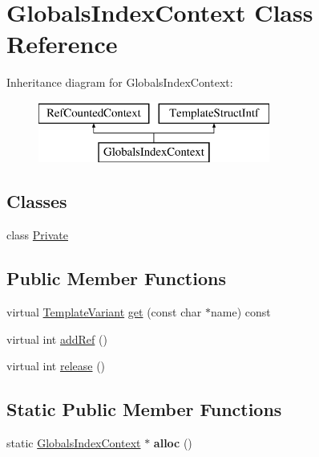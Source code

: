 \hypertarget{class_globals_index_context}{}\section{Globals\+Index\+Context Class Reference}
\label{class_globals_index_context}
Inheritance diagram for Globals\+Index\+Context\+:\begin{figure}[H]
\begin{center}
\leavevmode
\includegraphics[height=2.000000cm]{class_globals_index_context}
\end{center}
\end{figure}
\subsection*{Classes}
\begin{DoxyCompactItemize}
\item 
class \mbox{\hyperlink{class_globals_index_context_1_1_private}{Private}}
\end{DoxyCompactItemize}
\subsection*{Public Member Functions}
\begin{DoxyCompactItemize}
\item 
virtual \mbox{\hyperlink{class_template_variant}{Template\+Variant}} \mbox{\hyperlink{class_globals_index_context_a9838a4354e5e962d8ec3976dbbc7ba8d}{get}} (const char $\ast$name) const
\item 
virtual int \mbox{\hyperlink{class_globals_index_context_a90f2b7d7fd5fab2f29660ebcc1f99db4}{add\+Ref}} ()
\item 
virtual int \mbox{\hyperlink{class_globals_index_context_a65ba296c4327f8628017e4a1073237e3}{release}} ()
\end{DoxyCompactItemize}
\subsection*{Static Public Member Functions}
\begin{DoxyCompactItemize}
\item 
\mbox{\label{class_globals_index_context_a22a5920df2ef08fe0c7403ac14db0254}} 
static \mbox{\hyperlink{class_globals_index_context}{Globals\+Index\+Context}} $\ast$ {\bfseries alloc} ()
\end{DoxyCompactItemize}


